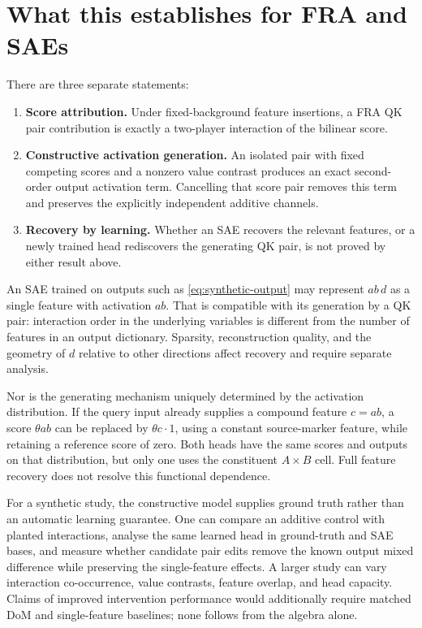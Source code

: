 \documentclass[11pt]{article}
\theoremstyle{plain}
\theoremstyle{definition}
\theoremstyle{remark}
\begin{document}
\section{What this establishes for FRA and SAEs}

There are three separate statements:
\begin{enumerate}
\item \textbf{Score attribution.} Under fixed-background feature insertions, a FRA QK pair contribution is exactly a two-player interaction of the bilinear score.
\item \textbf{Constructive activation generation.} An isolated pair with fixed competing scores and a nonzero value contrast produces an exact second-order output activation term. Cancelling that score pair removes this term and preserves the explicitly independent additive channels.
\item \textbf{Recovery by learning.} Whether an SAE recovers the relevant features, or a newly trained head rediscovers the generating QK pair, is not proved by either result above.
\end{enumerate}

An SAE trained on outputs such as \cref{eq:synthetic-output} may represent $ab\,d$ as a single feature with activation $ab$. That is compatible with its generation by a QK pair: interaction order in the underlying variables is different from the number of features in an output dictionary. Sparsity, reconstruction quality, and the geometry of $d$ relative to other directions affect recovery and require separate analysis.

Nor is the generating mechanism uniquely determined by the activation distribution. If the query input already supplies a compound feature $c=ab$, a score $\theta a b$ can be replaced by $\theta c\cdot1$, using a constant source-marker feature, while retaining a reference score of zero. Both heads have the same scores and outputs on that distribution, but only one uses the constituent $A\times B$ cell. Full feature recovery does not resolve this functional dependence.

For a synthetic study, the constructive model supplies ground truth rather than an automatic learning guarantee. One can compare an additive control with planted interactions, analyse the same learned head in ground-truth and SAE bases, and measure whether candidate pair edits remove the known output mixed difference while preserving the single-feature effects. A larger study can vary interaction co-occurrence, value contrasts, feature overlap, and head capacity. Claims of improved intervention performance would additionally require matched DoM and single-feature baselines; none follows from the algebra alone.
\end{document}
